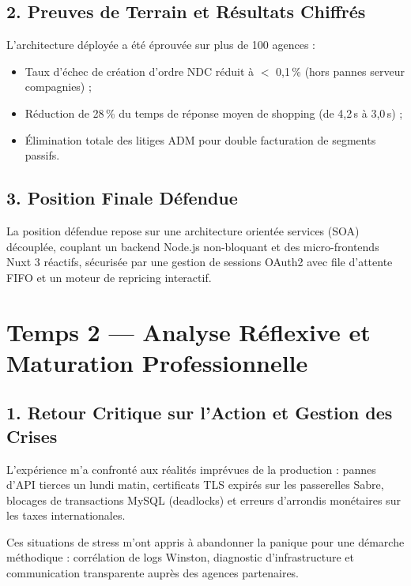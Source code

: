 \documentclass[11pt,a4paper]{article}
\begin{document}
\subsection*{2. Preuves de Terrain et Résultats Chiffrés}
L'architecture déployée a été éprouvée sur plus de 100 agences :
\begin{itemize}[itemsep=2pt]
    \item Taux d'échec de création d'ordre NDC réduit à $<$ 0,1\,\% (hors pannes serveur compagnies) ;
    \item Réduction de 28\,\% du temps de réponse moyen de shopping (de 4,2\,s à 3,0\,s) ;
    \item Élimination totale des litiges ADM pour double facturation de segments passifs.
\end{itemize}

\subsection*{3. Position Finale Défendue}
La position défendue repose sur une architecture orientée services (SOA) découplée, couplant un backend Node.js non-bloquant et des micro-frontends Nuxt 3 réactifs, sécurisée par une gestion de sessions OAuth2 avec file d'attente FIFO et un moteur de repricing interactif.

\vspace{0.4cm}
\section*{Temps 2 — Analyse Réflexive et Maturation Professionnelle}

\subsection*{1. Retour Critique sur l'Action et Gestion des Crises}
L'expérience m'a confronté aux réalités imprévues de la production : pannes d'API tierces un lundi matin, certificats TLS expirés sur les passerelles Sabre, blocages de transactions MySQL (deadlocks) et erreurs d'arrondis monétaires sur les taxes internationales.

Ces situations de stress m'ont appris à abandonner la panique pour une démarche méthodique : corrélation de logs Winston, diagnostic d'infrastructure et communication transparente auprès des agences partenaires.
\end{document}
